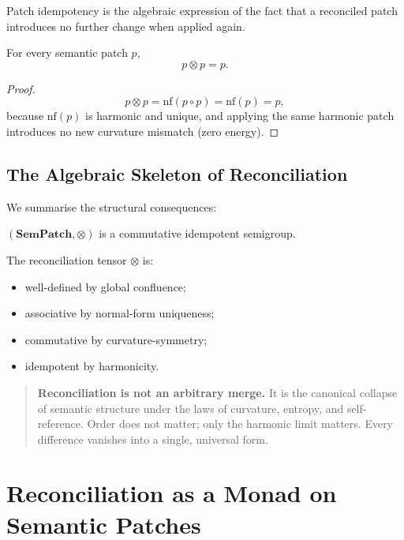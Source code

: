 Patch idempotency is the algebraic expression of the fact that a reconciled patch
introduces no further change when applied again.

\begin{theorem}[Idempotency]
\label{thm:79-idempotent}
For every semantic patch $p$,
\[
p \otimes p = p.
\]
\end{theorem}

\begin{proof}
\[
p \otimes p
  = \mathrm{nf}(p \circ p)
  = \mathrm{nf}(p)
  = p,
\]
because $\mathrm{nf}(p)$ is harmonic and unique, and applying the same harmonic
patch introduces no new curvature mismatch (zero energy).
\end{proof}

\subsection{The Algebraic Skeleton of Reconciliation}
\label{subsec:79-4-skeleton}

We summarise the structural consequences:

\begin{corollary}
\label{cor:79-semigroup}
$(\mathbf{SemPatch},\otimes)$ is a commutative idempotent semigroup.
\end{corollary}

\begin{corollary}
\label{cor:79-tensor}
The reconciliation tensor $\otimes$ is:
\begin{itemize}
\item well-defined by global confluence;
\item associative by normal-form uniqueness;
\item commutative by curvature-symmetry;
\item idempotent by harmonicity.
\end{itemize}
\end{corollary}

\begin{quote}
\textbf{Reconciliation is not an arbitrary merge.}  
It is the canonical collapse of semantic structure  
under the laws of curvature, entropy, and self-reference.  
Order does not matter; only the harmonic limit matters.  
Every difference vanishes into a single, universal form.
\end{quote}

\section{Reconciliation as a Monad on Semantic Patches}
\label{sec:79-5}

